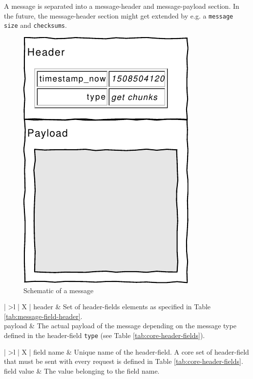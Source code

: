 A \gls{message} is separated into a \gls{message-header} and \gls{message-payload} section. In the future, the \gls{message-header} section might get extended by e.g. a \texttt{message size} and \texttt{checksums}.

\begin{figure}[h]
    \centering
    \includegraphics[width=0.3\linewidth]{resources/message_schematic}
    \caption[\Gls{message} Schematic]{Schematic of a \gls{message}}
    \label{fig:messageschematic}
\end{figure}

\begin{table}[H]
    \begin{tabu}{| >{\ttfamily}l | X |}
        \hline
        header
        & Set of \glspl{header-field} elements as specified in Table \ref{tab:message-field-header}. \\
        
        \hline
        payload
        & The actual payload of the message depending on the message type defined in the \gls{header-field} \texttt{type} (see Table \ref{tab:core-header-fields}). \\

        \hline
    \end{tabu}
    \caption[\Gls{message} Structure]{Structure of a \gls{message}.}
    \label{tab:message}
\end{table}

\begin{table}[H]
\begin{tabu}{| >{\ttfamily}l | X |}
    \hline
    field name
    & Unique name of the \gls{header-field}. A core set of \gls{header-field} that must be sent with every request is defined in Table \ref{tab:core-header-fields}. \\
    
    \hline
    field value
    & The value belonging to the field name. \\

    \hline
\end{tabu}
\caption{Structure of a \gls{header-field} Element}
\label{tab:message-field-header}
\end{table}


